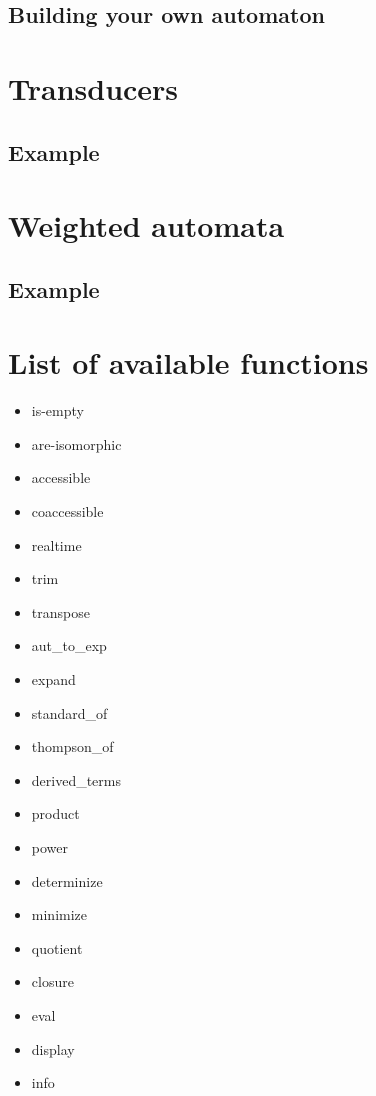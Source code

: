 \subsection{Building your own automaton}

\section{Transducers}
\subsection{Example}

\section{Weighted automata}
\subsection{Example}

\section{List of available functions}

\begin{itemize}
  \item is-empty
  \item are-isomorphic
  \item accessible
  \item coaccessible
  \item realtime
  \item trim
  \item transpose
  \item aut\_to\_exp
  \item expand
  \item standard\_of
  \item thompson\_of
  \item derived\_terms
  \item product
  \item power
  \item determinize
  \item minimize
  \item quotient
  \item closure
  \item eval
  \item display
  \item info
\end{itemize}
